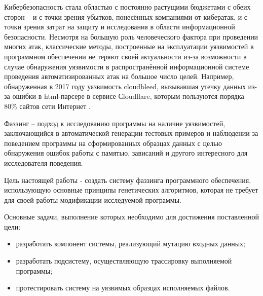 \label{sec:intro}


Кибербезопасность стала областью с постоянно растущими бюджетами с обеих сторон -- и с точки зрения убытков, понесённых компаниями от кибератак, и с точки зрения затрат на защиту и исследования в области информационной безопасности. Несмотря на большую роль человеческого фактора при проведении многих атак, классические методы, построенные на эксплуатации уязвимостей в программном обеспечении не теряют своей актуальности из-за возможности в случае обнаружения уязвимости в распространённой информационной системе проведения автоматизированных атак на большое число целей. Например, обнаруженная в 2017 году уязвимость cloudbleed, вызывавшая утечку данных из-за ошибки в html-парсере в сервисе Сloudflare, которым пользуются порядка 80\% сайтов сети Интернет \cite{cloudbleed}.





Фаззинг -- подход к исследованию программы на наличие уязвимостей, заключающийся в автоматической генерации тестовых примеров и наблюдении за поведением программы на сформированных образцах данных с целью обнаружения ошибок работы с памятью, зависаний и другого интересного для исследователя поведения.

Цель настоящей работы - создать систему фаззинга программного обеспечения, использующую основные принципы генетических алгоритмов, которая не требует для своей работы модификации исследуемой программы.

Основные задачи, выполнение которых необходимо для достижения поставленной цели:

\begin{itemize}
	\item разработать компонент системы, реализующий мутацию входных данных;
	
	\item разработать подсистему, осуществляющую трассировку выполняемой программы;
	
	\item протестировать систему на уязвимых образцах исполняемых файлов.
\end{itemize}